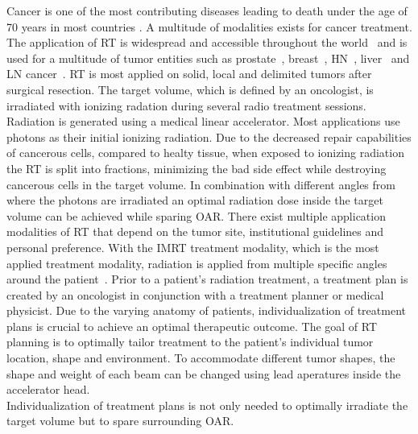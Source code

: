 Cancer is one of the most contributing diseases leading to death under the age of 70 years in most countries \cite{bray_everincreasing_2021}. 
A multitude of modalities exists for cancer treatment. 
The application of \Ac{RT} is widespread and accessible throughout the world~\cite{shahzad_overview_2018} and is used for a multitude of tumor entities such as prostate~\cite{geinitz_3d_2005, nguyen_curative_2005, budiharto_external_nodate}, breast~\cite{ragaz_adjuvant_1997, lena_combined_nodate, taylor_estimating_2017}, \ac{HN}~\cite{datta_head_1990, bhide_advances_2010, castadot_adaptive_2010, morgan_adaptive_2020}, liver~\cite{hoyer_radiotherapy_2012, wulf_stereotactic_2001, wulf_stereotactic_2006, sterzing_stereotactic_2014, witt_mri-guided_2020} and \ac{LN} cancer~\cite{degro_degro_2014, matsushita_stereotactic_2018, mikell_postoperative_2015, lundstedt_long-term_2012, jereczek-fossa_is_2015}.
\acs{RT} is most applied on solid, local and delimited tumors after surgical resection.
The target volume, which is defined by an oncologist, is irradiated with ionizing radation during several radio treatment sessions.
Radiation is generated using a medical linear accelerator. Most applications use photons as their initial ionizing radiation.
Due to the decreased repair capabilities of cancerous cells, compared to healty tissue, when exposed to ionizing radiation the \acs{RT} is split into fractions, minimizing the bad side effect while destroying cancerous cells in the target volume.
In combination with different angles from where the photons are irradiated an optimal radiation dose inside the target volume can be achieved while sparing \ac{OAR}. 
There exist multiple application modalities of \ac{RT} that depend on the tumor site, institutional guidelines and personal preference.
With the \ac{IMRT} treatment modality, which is the most applied treatment modality, radiation is applied from multiple specific angles around the patient~\cite{cho_intensity-modulated_2018}.
Prior to a patient's radiation treatment, a treatment plan is created by an oncologist in conjunction with a treatment planner or medical physicist.
Due to the varying anatomy of patients, individualization of treatment plans is crucial to achieve an optimal therapeutic outcome. 
The goal of \acs{RT} planning is to optimally tailor treatment to the patient's individual tumor location, shape and environment.
To accommodate different tumor shapes, the shape and weight of each beam can be changed using lead aperatures inside the accelerator head.\\
Individualization of treatment plans is not only needed to optimally irradiate the target volume but to spare surrounding \ac{OAR}.
